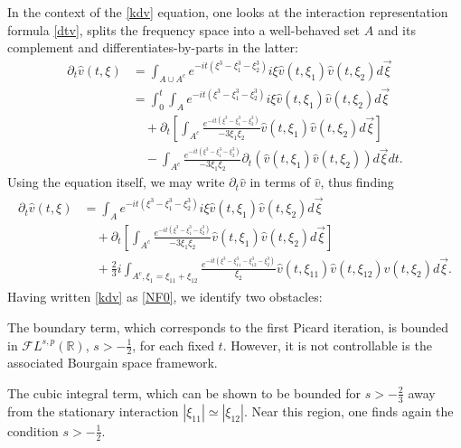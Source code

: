 \documentclass[%
11pt,  reqno]{amsart}
\newcommand{\5}{\textup{V}}
\newcommand{\noi}{\noindent}
\newcommand{\FL}{\mathcal{F} L}
\newcommand{\dt}{\partial_t}
\theoremstyle{remark}
\newcommand{\R}{\mathbb{R}}
\numberwithin{equation}{section}
\numberwithin{theorem}{section}
\begin{document}
\medskip
    
	In the context of the \eqref{kdv} equation, one looks at the interaction representation formula \eqref{dtv}, splits the frequency space into a well-behaved set $A$ and its complement and differentiates-by-parts in the latter:
	\begin{align}
		\dt\widehat{v}(t,\xi)&= \int_{A\cup A^c}e^{-it (\xi^3 -
			\xi_1^3 - \xi_2^3) } i\xi \widehat{v}(t, \xi_1) \widehat{v}(t,\xi_2) d\vec{\xi} 
		\\&\label{NF00}=\int_0^t \int_{A}e^{-it (\xi^3 -
			\xi_1^3 - \xi_2^3) } i\xi \widehat{v}(t, \xi_1) \widehat{v}(t,\xi_2) d\vec{\xi} \\&\quad + \dt\left[ \int_{A^c}\frac{e^{-it (\xi^3 -
				\xi_1^3 - \xi_2^3) }}{-3\xi_1\xi_2}  \widehat{v}(t, \xi_1) \widehat{v}(t,\xi_2) d\vec{\xi}\right] \\&\quad- \int_{A^c}\frac{e^{-it (\xi^3 -
				\xi_1^3 - \xi_2^3) }}{-3\xi_1\xi_2}  \partial_t\left(\widehat{v}(t, \xi_1) \widehat{v}(t,\xi_2)\right) d\vec{\xi}dt
		.
	\end{align}
	Using the equation itself, we may write $\partial_t\widehat{v}$ in terms of $\widehat{v}$, thus finding
	\begin{align}
		\label{NF0}
		\begin{split}
			\dt\widehat{v}(t,\xi)&=  \int_{A}e^{-it (\xi^3 -
				\xi_1^3 - \xi_2^3) } i\xi \widehat{v}(t, \xi_1) \widehat{v}(t,\xi_2) d\vec{\xi}\\&\quad + \dt\left[ \int_{A^c}\frac{e^{-it (\xi^3 -
					\xi_1^3 - \xi_2^3) }}{-3\xi_1\xi_2}  \widehat{v}(t, \xi_1) \widehat{v}(t,\xi_2) d\vec{\xi}\right] \\
			&\quad
			+\frac23 i
			\int_{A^c, \xi_1=\xi_{11}+\xi_{12}}\frac{e^{-it (\xi^3 -
					\xi_{11}^3-
					\xi_{12}^3 - \xi_2^3) }}{\xi_2}  \widehat{v}(t, \xi_{11})\widehat{v}(t, \xi_{12}) \widehat{v}(t,\xi_2) d\vec{\xi}
			.
		\end{split}
	\end{align}
Having written \eqref{kdv} as \eqref{NF0}, we identify two obstacles:

\smallskip
\noi{\rm(i)} The boundary term, which corresponds to the first Picard iteration, is bounded in $\FL^{s,p}(\R)$, $s>-\frac12$, for each fixed $t$. However, it is not controllable is the associated Bourgain space framework.

\smallskip
\noi{\rm(ii)} The cubic integral term, which can be shown to be bounded for $s>-\frac23$ away from the stationary interaction $|\xi_{11}|\simeq |\xi_{12}|$. Near this region, one finds again the condition $s>-\frac12$.
\end{document}
